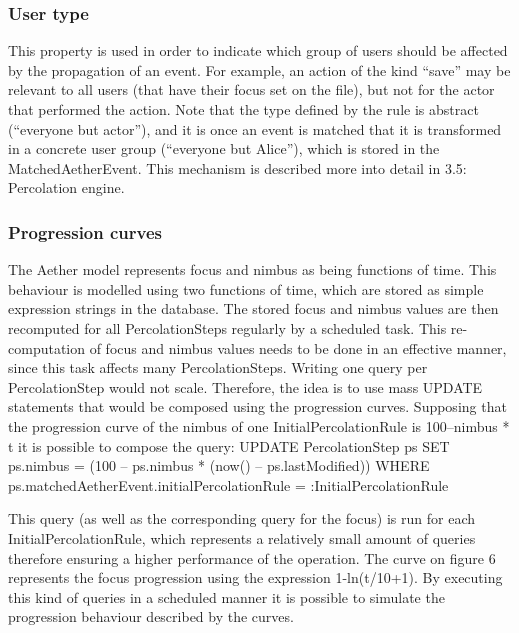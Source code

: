 \documentclass{ecscw2007}
\begin{document}
\subsubsection*{User type}
This property is used in order to indicate which group of users should be affected by the propagation of an event. For example, an action of the kind “save” may be relevant to all users (that have their focus set on the file), but not for the actor that performed the action. Note that the type defined by the rule is abstract (“everyone but actor”), and it is once an event is matched that it is transformed in a concrete user group (“everyone but Alice”), which is stored in the MatchedAetherEvent. This mechanism is described more into detail in 3.5: Percolation engine.

\subsubsection*{Progression curves}
The Aether model represents focus and nimbus as being functions of time. This behaviour is modelled using two functions of time, which are stored as simple expression strings in the database. The stored focus and nimbus values are then recomputed for all PercolationSteps regularly by a scheduled task.
This re-computation of focus and nimbus values needs to be done in an effective manner, since this task affects many PercolationSteps. Writing one query per PercolationStep would not scale.
Therefore, the idea is to use mass UPDATE statements that would be composed using the progression curves. Supposing that the progression curve of the nimbus of one InitialPercolationRule is 100–nimbus * t it is possible to compose the query:
UPDATE
       PercolationStep ps
SET
       ps.nimbus = (100 – ps.nimbus * (now() – ps.lastModified))
WHERE
       ps.matchedAetherEvent.initialPercolationRule = :InitialPercolationRule

This query (as well as the corresponding query for the focus) is run for each InitialPercolationRule, which represents a relatively small amount of queries therefore ensuring a higher performance of the operation.
The curve on figure 6 represents the focus progression using the expression 1-ln(t/10+1).
By executing this kind of queries in a scheduled manner it is possible to simulate the progression behaviour described by the curves.
\end{document}
